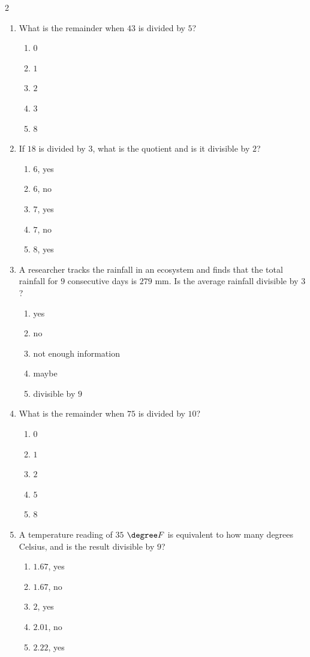 \documentclass[10pt]{article}
\begin{document}
\begin{multicols}{2}
\begin{enumerate}[label=\textbf{Q\arabic*.}, leftmargin=*, itemsep=6pt, parsep=0pt]
  \item \small What is the remainder when $43$ is divided by $5$?
  \begin{enumerate}[label=(\Alph*), leftmargin=0.6cm, nosep, itemsep=2pt]
    \item $0$
    \item $1$
    \item $2$
    \item $3$
    \item $8$
  \end{enumerate}

  \item \small If $18$ is divided by $3$, what is the quotient and is it divisible by $2$?
  \begin{enumerate}[label=(\Alph*), leftmargin=0.6cm, nosep, itemsep=2pt]
    \item $6$, yes
    \item $6$, no
    \item $7$, yes
    \item $7$, no
    \item $8$, yes
  \end{enumerate}

  \item \small A researcher tracks the rainfall in an ecosystem and finds that the total rainfall for $9$ consecutive days is $279$ mm. Is the average rainfall divisible by $3$?
  \begin{enumerate}[label=(\Alph*), leftmargin=0.6cm, nosep, itemsep=2pt]
    \item yes
    \item no
    \item not enough information
    \item maybe
    \item divisible by $9$
  \end{enumerate}

  \item \small What is the remainder when $75$ is divided by $10$?
  \begin{enumerate}[label=(\Alph*), leftmargin=0.6cm, nosep, itemsep=2pt]
    \item $0$
    \item $1$
    \item $2$
    \item $5$
    \item $8$
  \end{enumerate}

  \item \small A temperature reading of $35$ $\degree F$ is equivalent to how many degrees Celsius, and is the result divisible by $9$?
  \begin{enumerate}[label=(\Alph*), leftmargin=0.6cm, nosep, itemsep=2pt]
    \item $1.67$, yes
    \item $1.67$, no
    \item $2$, yes
    \item $2.01$, no
    \item $2.22$, yes
  \end{enumerate}


\end{enumerate}
\end{multicols}
\end{document}
